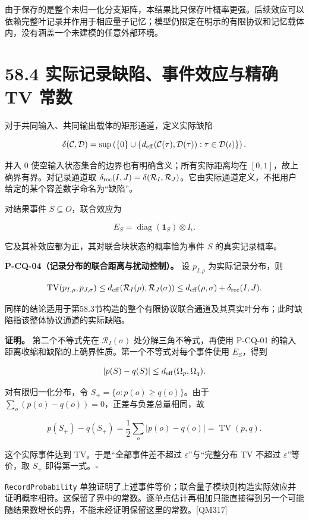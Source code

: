 \documentclass[
  11pt,
  oneside]{book}
\begin{document}
由于保存的是整个未归一化分支矩阵，本结果比只保存叶概率更强。后续效应可以依赖完整叶记录并作用于相应量子记忆；模型仍限定在明示的有限协议和记忆载体内，没有涵盖一个未建模的任意外部环境。

\section{58.4 实际记录缺陷、事件效应与精确 TV 常数}

对于共同输入、共同输出载体的矩形通道，定义实际缺陷

\[
\delta(\mathcal C,\mathcal D)=
\sup\left(\{0\}\cup\{d_{\rm eff}(\mathcal C(\tau),\mathcal D(\tau)):
\tau\in\mathcal D(\iota)\}\right).
\]

并入 \(0\) 使空输入状态集合的边界也有明确含义；所有实际距离均在
\([0,1]\)，故上确界有界。对记录通道取
\(\delta_{\rm rec}(I,J)=\delta(\mathcal R_I,\mathcal R_J)\)。它由实际通道定义，不把用户给定的某个容差数字命名为``缺陷''。

对结果事件 \(S\subseteq O\)，联合效应为

\[
E_S=\operatorname{diag}(\mathbf1_S)\otimes I_\iota.
\]

它及其补效应都为正，其对联合块状态的概率恰为事件 \(S\) 的真实记录概率。

\protect\hypertarget{p-cq-04}{}{}

\textbf{P-CQ-04（记录分布的联合距离与扰动控制）。} 设 \(p_{I,\rho}\)
为实际记录分布，则

\[
\operatorname{TV}(p_{I,\rho},p_{J,\sigma})
\le d_{\rm eff}(\mathcal R_I(\rho),\mathcal R_J(\sigma))
\le d_{\rm eff}(\rho,\sigma)+\delta_{\rm rec}(I,J).
\]

同样的结论适用于第58.3节构造的整个有限协议联合通道及其真实叶分布；此时缺陷指该整体协议通道的实际缺陷。

\textbf{证明。} 第二个不等式先在 \(\mathcal R_I(\sigma)\)
处分解三角不等式，再使用 P-CQ-01
的输入距离收缩和缺陷的上确界性质。第一个不等式对每个事件使用
\(E_S\)，得到

\[
|p(S)-q(S)|\le d_{\rm eff}(\Omega_p,\Omega_q).
\]

对有限归一化分布，令 \(S_+=\{o:p(o)\ge q(o)\}\)。由于
\(\sum_o(p(o)-q(o))=0\)，正差与负差总量相同，故

\[
p(S_+)-q(S_+)=\frac12\sum_o|p(o)-q(o)|=\operatorname{TV}(p,q).
\]

这个实际事件达到 TV。于是``全部事件差不超过
\(\varepsilon\)''与``完整分布 TV 不超过 \(\varepsilon\)''等价，取
\(S_+\) 即得第一式。\(\square\)

\texttt{Record\allowbreak Probability}
单独证明了上述事件等价；联合量子模块则构造实际效应并证明概率相符。这保留了界中的常数。逐单点估计再相加只能直接得到另一个可能随结果数增长的界，不能未经证明保留这里的常数。{[}QM317{]}
\end{document}

